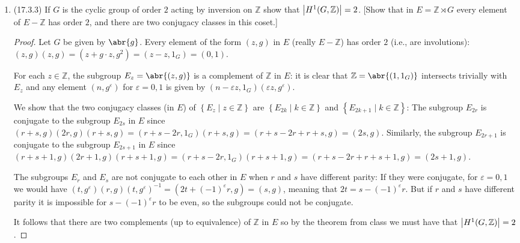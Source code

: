 \documentclass[11pt]{article}
\newcommand{\cbr}[1]{\left\{#1\right\}}
\DeclareMathOperator{\im}{im}
\begin{document}
\begin{enumerate}
\begin{enumerate}
\begin{proof}
            The next cohomology group is $H^1(G,A) = \ker(0)/\im(\sigma-1)\cong A/(\sigma-1)A$. The remaining cohomology groups for $n\geq 2$ are given by $H^n(G,A) = \ker(0)/\im(0) = 0$. 
        \end{proof}
    \end{enumerate}
    \item (17.3.3) If $G$ is the cyclic group of order $2$ acting by inversion on $\mathbb{Z}$ show that $\abs{H^1(G,\mathbb{Z})} = 2$. [Show that in $E = \mathbb{Z}\rtimes G$ every element of $E-\mathbb{Z}$ has order $2$, and there are two conjugacy classes in this coset.] \begin{proof}
        Let $G$ be given by $\abr{g}$. Every element of the form $(z,g)$ in $E$ (really $E-\mathbb{Z}$) has order $2$ (i.e., are involutions): $(z,g)(z,g) = (z+g\cdot z,g^2) = (z-z,1_G) = (0,1)$.

        For each $z\in\mathbb{Z}$, the subgroup $E_z = \abr{(z,g)}$ is a complement of $\mathbb{Z}$ in $E$: it is clear that $\mathbb{Z} = \abr{(1,1_G)}$ intersects trivially with $E_z$ and any element $(n,g^\varepsilon)$ for $\varepsilon = 0,1$ is given by $(n-\varepsilon z, 1_G)(\varepsilon z, g^\varepsilon)$.

        We show that the two conjugacy classes (in $E$) of $\cbr{E_z\mid z\in\mathbb{Z}}$ are $\cbr{E_{2k}\mid k\in\mathbb{Z}}$ and $\cbr{E_{2k+1}\mid k\in\mathbb{Z}}$: The subgroup $E_{2r}$ is conjugate to the subgroup $E_{2s}$ in $E$ since $(r+s,g)(2r,g)(r+s,g) = (r+s-2r,1_G)(r+s,g) = (r+s-2r+r+s,g) = (2s,g)$. Similarly, the subgroup $E_{2r+1}$ is conjugate to the subgroup $E_{2s+1}$ in $E$ since $(r+s+1,g)(2r+1,g)(r+s+1,g) = (r+s-2r,1_G)(r+s+1,g) = (r+s-2r+r+s+1,g) = (2s+1,g)$.

        The subgroups $E_{r}$ and $E_{s}$ are not conjugate to each other in $E$ when $r$ and $s$ have different parity: If they were conjugate, for $\varepsilon = 0,1$ we would have $(t,g^\varepsilon)(r,g)(t,g^\varepsilon)^{-1} = (2t+(-1)^\varepsilon r,g) = (s,g)$, meaning that $2t = s-(-1)^\varepsilon r$. But if $r$ and $s$ have different parity it is impossible for $s-(-1)^\varepsilon r$ to be even, so the subgroups could not be conjugate.

        It follows that there are two complements (up to equivalence) of $\mathbb{Z}$ in $E$ so by the theorem from class we must have that $\abs{H^1(G,\mathbb{Z})} = 2$. 
    \end{proof}
\end{enumerate}
\end{document}

